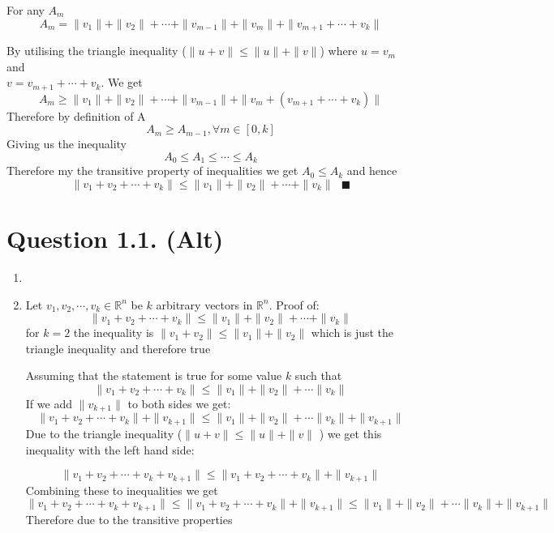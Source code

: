 \documentclass[11pt,a4paper]{article}
\newcommand{\R}{\mathbb{R}}
\begin{document}
\begin{enumerate}[label=\alph*.]
            For any $A_m$
                \[
                    A_m = \| v_1 \| + \| v_2 \| + \cdots + \| v_{m - 1}\| + \| v_m \| + \| v_{m+1} + \cdots + v_k \|
                \]

                By utilising the triangle inequality ($ \| u + v \| \leq \| u \| + \|v \|$) where $ u = v_m $ and  \\ $v = v_{m+1} + \cdots + v_k$. We get
                \[
                    A_m \geq \| v_1 \| + \| v_2 \| + \cdots + \| v_{m-1} \| + \| v_m + (v_{m+1} + \cdots + v_k)\|
                \]
                Therefore by definition of A 
                \[
                    A_m \geq A_{m - 1}, \forall m \in [0, k]
                \]
                Giving us the inequality
                \[
                    A_0 \leq A_1 \leq \cdots \leq A_k
                \]
                Therefore my the transitive property of inequalities we get $A_0 \leq A_k$ and hence
                \[
                    \| v_1 + v_2 + \cdots + v_k \| \leq \|v_1 \| + \| v_2 \| + \cdots + \| v_k \| \ \ \  \blacksquare
                \]
    \end{enumerate}

    \section*{Question 1.1. (Alt)}

    \begin{enumerate}[label=\alph*.]
        \item
        \item Let $v_1, v_2, \cdots , v_k \in \R^n$ be $k$ arbitrary vectors in $\R^n$.
            Proof of:
                \[
                    \|v_1 + v_2 + \cdots + v_k\| \leq \| v_1 \| + \| v_2 \| + \cdots + \| v_k \|
                \]
            for $k =2$ the inequality is $\|v_1 + v_2\| \leq \|v_1\| + \| v_2\|$ which is just the triangle inequality and therefore true

            Assuming that the statement is true for some value $k$ such that
            \[
                \| v_1  + v_2 + \cdots + v_k \| \leq \| v_1 \| + \| v_2 \| + \cdots \| v_k \|
            \]
            If we add $\|v_{k+1}\|$ to both sides we get:
            \[
                \| v_1  + v_2 + \cdots + v_k \| + \| v_{k+1} \| \leq \| v_1 \| + \| v_2 \| + \cdots \| v_k \| +\| v_{k+1} \|
            \]
            Due to the triangle inequality ($ \| u + v \| \leq \| u \| + \| v \| $ ) we get this inequality with the left hand side:

            \[
                \| v_1 + v_2 + \cdots + v_k + v_{k+1} \| \leq \| v_1  + v_2 + \cdots + v_k \| + \| v_{k+1} \|
            \]
            Combining these to inequalities we get
            \[
                \| v_1 + v_2 + \cdots + v_k + v_{k+1} \| \leq \| v_1  + v_2 + \cdots + v_k \| + \| v_{k+1} \| \leq \| v_1 \| + \| v_2 \| + \cdots \| v_k \| +\| v_{k+1} \|
            \]
            Therefore due to the transitive properties

    \end{enumerate}
\end{document}
